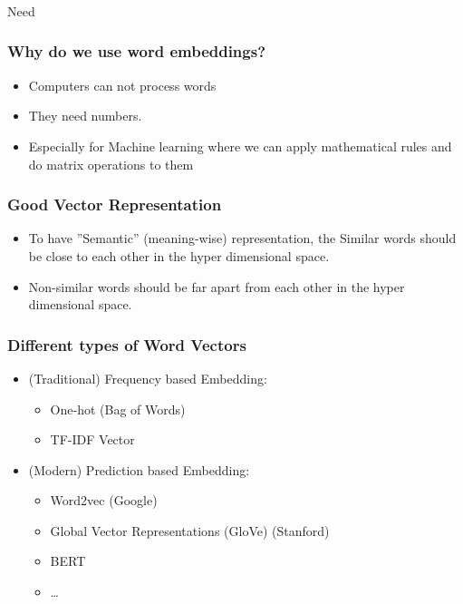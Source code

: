 \begin{frame}[fragile]\frametitle{}

\begin{center}
{\Large Need}
\end{center}
\end{frame}

\begin{frame}[fragile]\frametitle{Why do we use word embeddings?}
  \begin{itemize}
    \item Computers can not process words
	\item They need numbers.
	\item Especially for Machine learning where we can apply mathematical rules and do matrix operations to them
  \end{itemize}


\end{frame}






\begin{frame}[fragile]\frametitle{Good Vector Representation}
\begin{itemize}
\item To have ''Semantic'' (meaning-wise) representation, the Similar words should be close to each other in the hyper dimensional space.
\item Non-similar words should be far apart from each other in the hyper dimensional space.
\end{itemize}
\end{frame}


\begin{frame}[fragile]\frametitle{Different types of Word Vectors}
\begin{itemize}
\item (Traditional) Frequency based Embedding:
\begin{itemize}
\item One-hot (Bag of Words)
\item TF-IDF Vector
\end{itemize}
\item (Modern) Prediction based Embedding:
\begin{itemize}
\item Word2vec  (Google)
\item Global Vector Representations (GloVe)   (Stanford)
\item BERT
\item \ldots
\end{itemize}
\end{itemize}
\end{frame}

